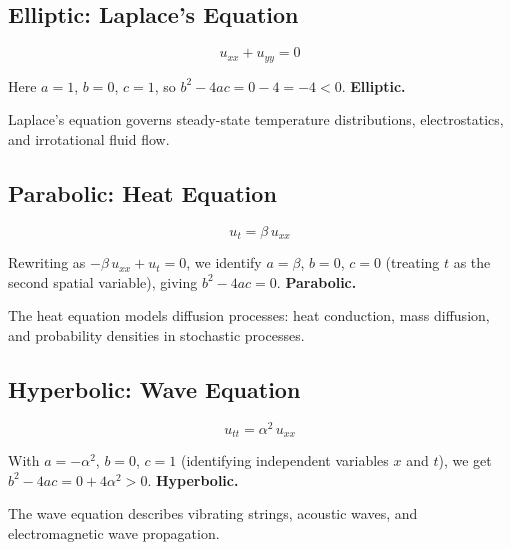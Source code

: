\subsection{Elliptic: Laplace's Equation}

\[
  u_{xx} + u_{yy} = 0
\]

Here $a=1$, $b=0$, $c=1$, so $b^2 - 4ac = 0 - 4 = -4 < 0$. \textbf{Elliptic.}

\begin{remark}
Laplace's equation governs steady-state temperature distributions, electrostatics, and irrotational fluid flow.
\end{remark}

\subsection{Parabolic: Heat Equation}

\[
  u_t = \beta\, u_{xx}
\]

Rewriting as $-\beta\,u_{xx} + u_t = 0$, we identify $a = \beta$, $b = 0$, $c = 0$ (treating $t$ as the second spatial variable), giving $b^2 - 4ac = 0$. \textbf{Parabolic.}

\begin{remark}
The heat equation models diffusion processes: heat conduction, mass diffusion, and probability densities in stochastic processes.
\end{remark}

\subsection{Hyperbolic: Wave Equation}

\[
  u_{tt} = \alpha^2\, u_{xx}
\]

With $a = -\alpha^2$, $b = 0$, $c = 1$ (identifying independent variables $x$ and $t$), we get $b^2 - 4ac = 0 + 4\alpha^2 > 0$. \textbf{Hyperbolic.}

\begin{remark}
The wave equation describes vibrating strings, acoustic waves, and electromagnetic wave propagation.
\end{remark}
